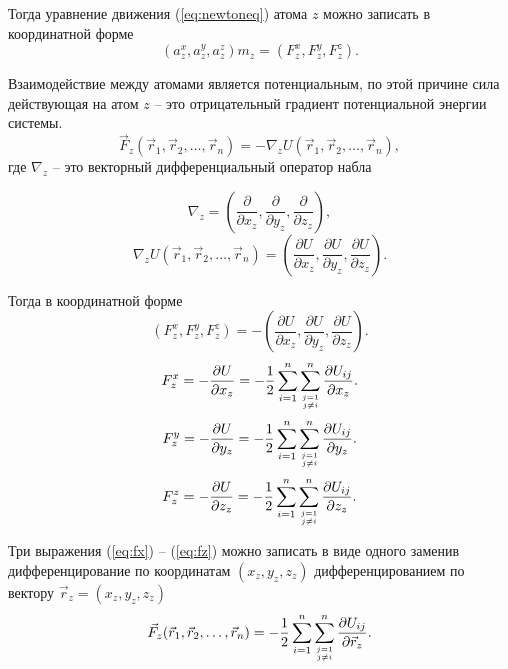 Тогда уравнение движения (\ref{eq:newtoneq}) атома $z$ можно записать в координатной форме
\begin{equation}
(a_{z}^{x}, a_{z}^{y}, a_{z}^{z}) m_z = (F_{z}^{x}, F_{z}^{y}, F_{z}^{z}).
\end{equation}

Взаимодействие между атомами является потенциальным, по этой причине сила действующая на атом $z$ -- это отрицательный градиент потенциальной энергии системы.
\begin{equation}
\vec{F}_z(\vec{r}_1, \vec{r}_2, \ldots, \vec{r}_n) = - \nabla_z U(\vec{r}_1, \vec{r}_2, \ldots, \vec{r}_n),
\end{equation}
где $\nabla_z$ -- это векторный дифференциальный оператор набла

\begin{equation}
\nabla_z = (\frac{\partial}{\partial x_z}, \frac{\partial}{\partial y_z}, \frac{\partial}{\partial z_z}),
\end{equation}
\begin{equation}
\nabla_z U(\vec{r}_1, \vec{r}_2, \ldots, \vec{r}_n) = (\frac{\partial U}{\partial x_z}, \frac{\partial U}{\partial y_z}, \frac{\partial U}{\partial z_z}).
\end{equation}

Тогда в координатной форме
\begin{equation}
(F_{z}^{x}, F_{z}^{y}, F_{z}^{z}) = - (\frac{\partial U}{\partial x_z}, \frac{\partial U}{\partial y_z}, \frac{\partial U}{\partial z_z}).
\end{equation}
\begin{equation}\label{eq:fx}
F_{z}^{x} = - \frac{\partial U}{\partial x_z} = - \frac{1}{2}\sum_{i = 1}^{n}\sum_{j = 1 \atop j \neq i}^{n} \frac{\partial U_{ij}}{\partial x_z} .
\end{equation}
\begin{equation}\label{eq:fy}
F_{z}^{y} = - \frac{\partial U}{\partial y_z} = - \frac{1}{2}\sum_{i = 1}^{n}\sum_{j = 1 \atop j \neq i}^{n} \frac{\partial U_{ij}}{\partial y_z} .
\end{equation}
\begin{equation}\label{eq:fz}
F_{z}^{z} = - \frac{\partial U}{\partial z_z} = - \frac{1}{2}\sum_{i = 1}^{n}\sum_{j = 1 \atop j \neq i}^{n} \frac{\partial U_{ij}}{\partial z_z} .
\end{equation}

Три выражения (\ref{eq:fx}) -- (\ref{eq:fz}) можно записать в виде одного заменив дифференцирование по координатам $(x_z, y_z, z_z)$ дифференцированием по вектору $\vec{r}_z = (x_z, y_z, z_z)$
\begin{equation}
\vec{F}_z(\vec{r}_1, \vec{r}_2, \ldots, \vec{r}_n)  = - \frac{1}{2}\sum_{i = 1}^{n}\sum_{j = 1 \atop j \neq i}^{n} \frac{\partial U_{ij}}{\partial \vec{r}_z} .
\end{equation}

